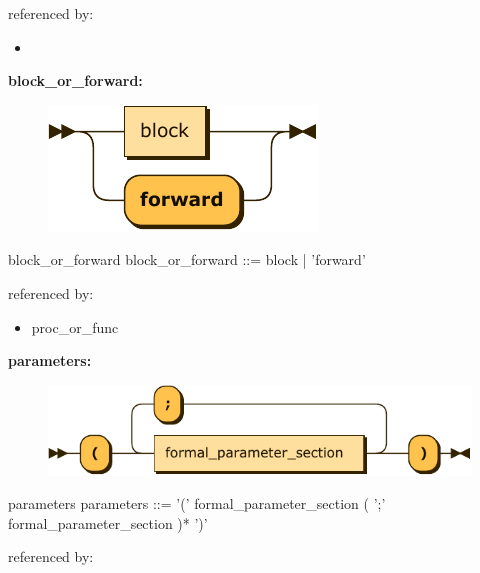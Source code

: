 \documentclass[10pt,a4paper,twoside]{article}
\providecommand{\tightlist}{%
  \setlength{\itemsep}{0pt}\setlength{\parskip}{0pt}}
\newcounter{grammarbox}[section]
\begin{document}
referenced by:

\begin{itemize}
\tightlist
\item
\end{itemize}

\textbf{block\_or\_forward:}

\begin{figure}[H]
\centering
\includegraphics{diagram/block_or_forward.pdf}

\end{figure}

\begin{grammarbox}{block\_or\_forward}
\vspace{0.5em}
block\_or\_forward
         ::= block
           | 'forward'
\end{grammarbox}

referenced by:

\begin{itemize}
\tightlist
\item
  proc\_or\_func
\end{itemize}

\textbf{parameters:}

\begin{figure}[H]
\centering
\includegraphics{diagram/parameters.pdf}

\end{figure}

\begin{grammarbox}{parameters}
\vspace{0.5em}
parameters
         ::= '(' formal\_parameter\_section ( ';' formal\_parameter\_section )* ')'
\end{grammarbox}

referenced by:
\end{document}
